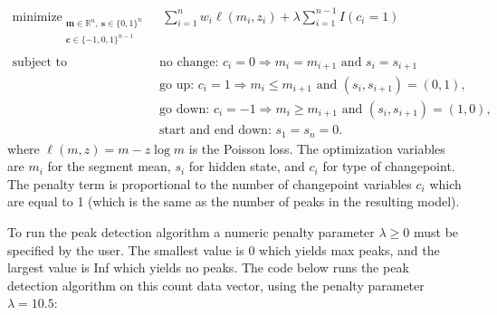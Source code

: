 \documentclass[12pt]{article}\usepackage[]{graphicx}\usepackage[]{color}
\DeclareMathOperator*{\minimize}{minimize}
\begin{document}
\begin{align*}
  \minimize_{
    \substack{
    \mathbf m\in\mathbb R^n,\ \mathbf s\in\{0, 1\}^n\\
\mathbf c\in\{-1, 0,1\}^{n-1}\\
}
    } &\ \ 
  \sum_{i=1}^n w_i \ell(m_i, z_i) + \lambda \sum_{i=1}^{n-1} I(c_i = 1) \\
  \text{subject to\ \ } &\ \text{no change: }c_i = 0 \Rightarrow m_i = m_{i+1}\text{ and }s_i=s_{i+1}
  \nonumber\\
&\ \text{go up: }c_i = 1 \Rightarrow m_i \leq m_{i+1}\text{ and }(s_i,s_{i+1})=(0,1),
  \nonumber\\
&\ \text{go down: } c_i = -1 \Rightarrow m_i \geq m_{i+1}\text{ and }(s_i,s_{i+1})=(1,0),\\
  & \ \text{start and end down: } s_1=s_n=0.\nonumber
\end{align*}
where $\ell(m, z)= m - z\log m$ is the Poisson loss. The optimization
variables are $m_i$ for the segment mean, $s_i$ for hidden state, and
$c_i$ for type of changepoint. The penalty term is proportional to the number of
changepoint variables $c_i$ which are equal to 1 (which is the same as
the number of peaks in the resulting model).

To run the peak detection algorithm a numeric penalty parameter
$\lambda\geq 0$ must be specified by the user. The smallest value is 0
which yields max peaks, and the largest value is Inf which yields no
peaks.  The code below runs the peak detection algorithm on this count
data vector, using the penalty parameter $\lambda = 10.5$:
\end{document}
